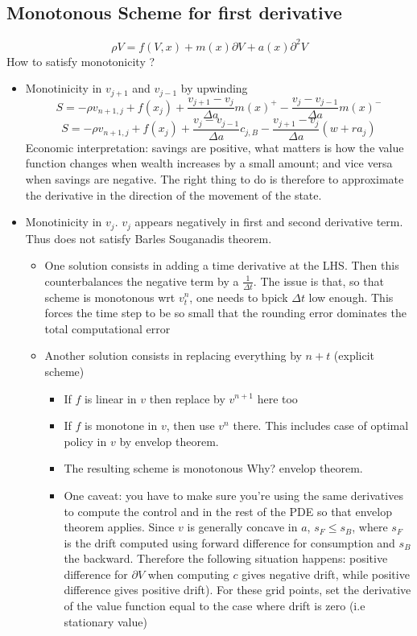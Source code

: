 \documentclass[english]{article}
\begin{document}
\subsection{Monotonous Scheme for first derivative}
$$\rho V = f(V, x) + m(x) \partial V + a(x) \partial^2V$$ 
How to satisfy monotonicity ?
\begin{itemize}
	\item Monotinicity in $v_{j+1}$ and $v_{j-1}$ by upwinding
	$$S =-\rho v_{n+1, j} + f(x_j) + \frac{v_{j+1}-v_{j}}{\Delta a} m(x)^+ - \frac{v_j-v_{j-1}}{\Delta a} m(x)^-$$
	$$S =-\rho v_{n+1, j} + f(x_j) + \frac{v_j-v_{j-1}}{\Delta a} c_{j, B} - \frac{v_{j+1}-v_j}{\Delta a} (w + ra_j)$$
	Economic interpretation:  savings are positive, what matters is how the value function changes when wealth increases by a small amount; and vice versa when savings are negative. The right thing to do is therefore to approximate the derivative in the direction of the movement of the state.
	\item Monotinicity in $v_{j}$. $v_j$ appears negatively in first and second derivative term. Thus does not satisfy Barles Souganadis theorem.
	\begin{itemize}
		\item One solution consists in adding a time derivative at the LHS. Then this counterbalances the negative term by a $\frac{1}{\Delta t}$. 
		The issue is that, so that scheme is monotonous wrt $v^n_t$, one needs to bpick $\Delta t$ low enough. This forces the time step to be so small	that the rounding error dominates the total computational error
		\item Another solution consists in replacing everything by $n+t$ (explicit scheme)
		\begin{itemize}
			\item If $f$ is linear in $v$ then replace by $v^{n+1}$ here too
			\item If $f$ is monotone in $v$, then use $v^n$ there. This includes case of optimal policy in $v$ by envelop theorem.
			\item The resulting scheme is monotonous Why? envelop theorem.
			\item     One caveat: you have to make sure you're using the same derivatives to compute the control and in the rest of the PDE so that envelop theorem applies.
			Since $v$ is generally concave in $a$, $s_F \leq s_B$, where $s_F$ is the drift computed using forward difference for consumption and $s_B$ the backward. Therefore the following situation happens: positive difference for $\partial V$ when computing $c$ gives negative drift, while positive difference gives positive drift). For these grid points, set the derivative of the value function equal to the case where drift is zero (i.e stationary value)

\end{itemize}
\end{itemize}
\end{itemize}
\end{document}
